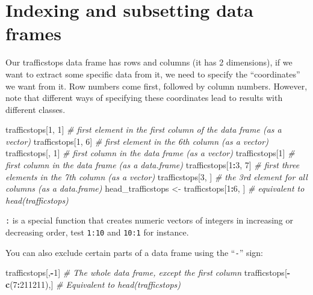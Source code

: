 \documentclass[]{book}
\newenvironment{Shaded}{\begin{snugshade}}{\end{snugshade}}
\newcommand{\KeywordTok}[1]{\textcolor[rgb]{0.13,0.29,0.53}{\textbf{#1}}}
\newcommand{\DecValTok}[1]{\textcolor[rgb]{0.00,0.00,0.81}{#1}}
\newcommand{\StringTok}[1]{\textcolor[rgb]{0.31,0.60,0.02}{#1}}
\newcommand{\CommentTok}[1]{\textcolor[rgb]{0.56,0.35,0.01}{\textit{#1}}}
\newcommand{\OperatorTok}[1]{\textcolor[rgb]{0.81,0.36,0.00}{\textbf{#1}}}
\newcommand{\NormalTok}[1]{#1}
\theoremstyle{definition}
\theoremstyle{definition}
\theoremstyle{remark}
\begin{document}
\section{Indexing and subsetting data
frames}\label{indexing-and-subsetting-data-frames}

Our trafficstops data frame has rows and columns (it has 2 dimensions),
if we want to extract some specific data from it, we need to specify the
``coordinates'' we want from it. Row numbers come first, followed by
column numbers. However, note that different ways of specifying these
coordinates lead to results with different classes.

\begin{Shaded}
\begin{Highlighting}[]
\NormalTok{trafficstops[}\DecValTok{1}\NormalTok{, }\DecValTok{1}\NormalTok{]   }\CommentTok{# first element in the first column of the data frame (as a vector)}
\NormalTok{trafficstops[}\DecValTok{1}\NormalTok{, }\DecValTok{6}\NormalTok{]   }\CommentTok{# first element in the 6th column (as a vector)}
\NormalTok{trafficstops[, }\DecValTok{1}\NormalTok{]    }\CommentTok{# first column in the data frame (as a vector)}
\NormalTok{trafficstops[}\DecValTok{1}\NormalTok{]      }\CommentTok{# first column in the data frame (as a data.frame)}
\NormalTok{trafficstops[}\DecValTok{1}\OperatorTok{:}\DecValTok{3}\NormalTok{, }\DecValTok{7}\NormalTok{] }\CommentTok{# first three elements in the 7th column (as a vector)}
\NormalTok{trafficstops[}\DecValTok{3}\NormalTok{, ]    }\CommentTok{# the 3rd element for all columns (as a data.frame)}
\NormalTok{head_trafficstops <-}\StringTok{ }\NormalTok{trafficstops[}\DecValTok{1}\OperatorTok{:}\DecValTok{6}\NormalTok{, ] }\CommentTok{# equivalent to head(trafficstops)}
\end{Highlighting}
\end{Shaded}

\texttt{:} is a special function that creates numeric vectors of
integers in increasing or decreasing order, test \texttt{1:10} and
\texttt{10:1} for instance.

You can also exclude certain parts of a data frame using the
``\texttt{-}'' sign:

\begin{Shaded}
\begin{Highlighting}[]
\NormalTok{trafficstops[,}\OperatorTok{-}\DecValTok{1}\NormalTok{]          }\CommentTok{# The whole data frame, except the first column}
\NormalTok{trafficstops[}\OperatorTok{-}\KeywordTok{c}\NormalTok{(}\DecValTok{7}\OperatorTok{:}\DecValTok{211211}\NormalTok{),] }\CommentTok{# Equivalent to head(trafficstops)}
\end{Highlighting}
\end{Shaded}
\end{document}
